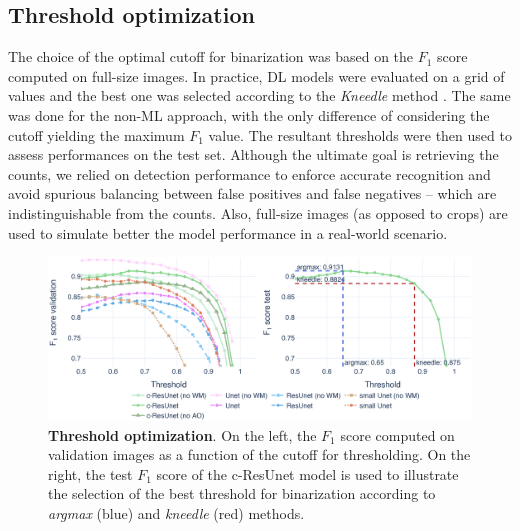 \subsection{Threshold optimization}

The choice of the optimal cutoff for binarization was based on the $F_1$ score computed on full-size images. In practice, DL models were evaluated on a grid of values and the best one was selected according to the \textit{Kneedle} method \cite{kneedle}. 
The same was done for the non-ML approach, with the only difference of considering the cutoff yielding the maximum $F_1$ value. 
The resultant thresholds were then used to assess performances on the test set.
Although the ultimate goal is retrieving the counts, we relied on detection performance to enforce accurate recognition and avoid spurious balancing between false positives and false negatives -- which are indistinguishable from the counts.
Also, full-size images (as opposed to crops) are used to simulate better the model performance in a real-world scenario.
\begin{figure}
\centerline{
\includegraphics[width=\textwidth]{figures/130_methods/F1_optimization.eps}
}
\caption{\textbf{Threshold optimization}. On the left, the $F_{1}$ score computed on validation images as a function of the cutoff for thresholding.
On the right, the test $F_1$ score of the c-ResUnet model is used to illustrate the selection of the best threshold for binarization according to \textit{argmax} (blue) and \textit{kneedle} (red) methods.
} 
\label{fig:thresh_opt}
\end{figure}

